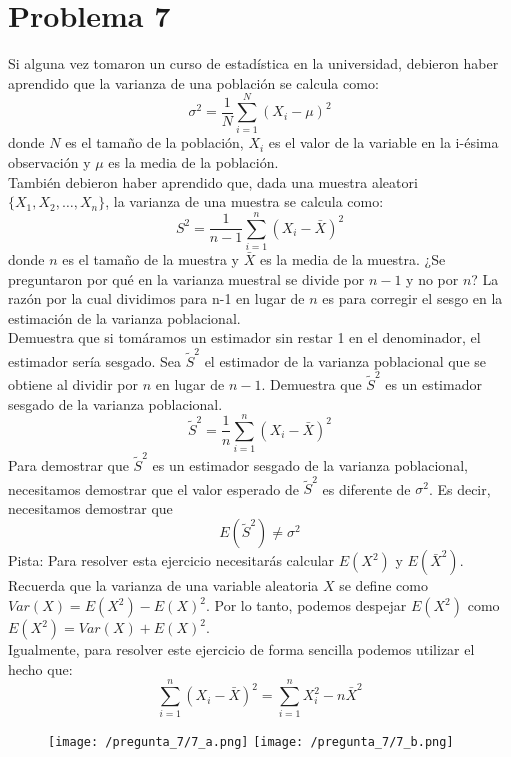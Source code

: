 \documentclass[a4paper]{article}
\begin{document}
\section*{Problema 7}

Si alguna vez tomaron un curso de estadística en la universidad, debieron haber aprendido que la varianza de una población se calcula como: 
$$
\sigma^2=
	\frac{1}{N} 
	\sum_{i=1}^{N}
	(X_i-\mu)^2
$$
donde $N$ es el tamaño de la población, $X_i$ es el valor de la variable en la i-ésima observación y $\mu$ es la media de la población.
\\
También debieron haber aprendido que, dada una muestra aleatori $\{X_1, X_2, \ldots, X_n\}$, la varianza de una muestra se calcula como:
$$
S^2=
	\frac{1}{n-1}
	\sum_{i=1}^{n}
	(X_i-\bar{X})^2
$$
donde $n$ es el tamaño de la muestra y $\bar{X}$ es la media de la muestra. ¿Se preguntaron por qué en la varianza muestral se divide por $n-1$ y no por $n$? La razón por la cual dividimos para n-1 en lugar de $n$ es para corregir el sesgo en la estimación de la varianza poblacional.
\\
Demuestra que si tomáramos un estimador sin restar 1 en el denominador, el estimador sería sesgado. Sea $\tilde{S}^2$ el estimador de la varianza poblacional que se obtiene al dividir por $n$ en lugar de $n-1$. Demuestra que $\tilde{S}^2$ es un estimador sesgado de la varianza poblacional.
$$
\tilde{S}^2=
	\frac{1}{n}
	\sum_{i=1}^{n}	
	(X_i-\bar{X})^2
$$
Para demostrar que $\tilde{S}^2$ es un estimador sesgado de la varianza poblacional, necesitamos demostrar que el valor esperado de $\tilde{S}^2$ es diferente de $\sigma^2$. Es decir, necesitamos demostrar que
$$
E(\tilde{S}^2)\neq\sigma^2
$$
Pista: Para resolver esta ejercicio necesitarás calcular $E(X^2)$ y $E(\bar{X}^2)$. Recuerda que la varianza de una variable aleatoria $X$ se define como $Var(X)=E(X^2)-E(X)^2$. Por lo tanto, podemos despejar $E(X^2)$ como $E(X^2)=Var(X)+E(X)^2$.
\\
Igualmente, para resolver este ejercicio de forma sencilla podemos utilizar el hecho que: 
$$
\sum_{i=1}^{n} (X_i-\bar{X})^2=
	\sum_{i=1}^{n}
	X_{i}^{2}
	-
	n
	\bar{X}^2
$$ 

\begin{figure}[H]
	\centering
	\texttt{[image: /pregunta\_7/7\_a.png]}
	\vspace{0cm}
	\texttt{[image: /pregunta\_7/7\_b.png]}
\end{figure}
\end{document}

